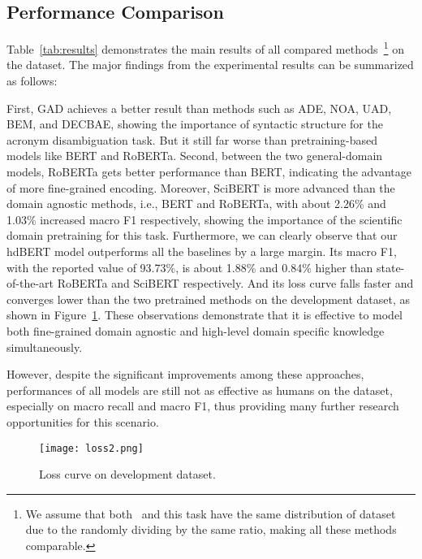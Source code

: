\subsection{Performance Comparison}

Table~\ref{tab:results} demonstrates the main results of all compared methods~\footnote{We assume that both~\citeauthor{veyseh-et-al-2020-what} and this task have the same distribution of dataset due to the randomly dividing by the same ratio, making all these methods comparable.} on the dataset.
The major findings from the experimental results can be summarized as follows:

First, GAD achieves a better result than methods such as ADE, NOA, UAD, BEM, and DECBAE, showing the importance of syntactic structure for the acronym disambiguation task. But it still far worse than pretraining-based models like BERT and RoBERTa.
Second, between the two general-domain models, RoBERTa gets better performance than BERT, indicating the advantage of more fine-grained encoding. Moreover, SciBERT is more advanced than the domain agnostic methods, i.e., BERT and RoBERTa, with about 2.26\% and 1.03\% increased macro F1 respectively, showing the importance of the scientific domain pretraining for this task.
Furthermore, we can clearly observe that our hdBERT model outperforms all the baselines by a large margin. 
Its macro F1, with the reported value of 93.73\%, is about 1.88\% and 0.84\% higher than state-of-the-art RoBERTa and SciBERT respectively.
And its loss curve falls faster and converges lower than the two pretrained methods on the development dataset, as shown in Figure~\ref{fig:loss}.
These observations demonstrate that it is effective to model both fine-grained domain agnostic and high-level domain specific knowledge simultaneously.

However, despite the significant improvements among these approaches, performances of all models are still not as effective as humans on the dataset, especially on macro recall and macro F1, thus providing many further research opportunities for this scenario.

\begin{figure}
    \centering
    \texttt{[image: loss2.png]}
    \caption{Loss curve on development dataset.}
    \label{fig:loss}
\end{figure}


